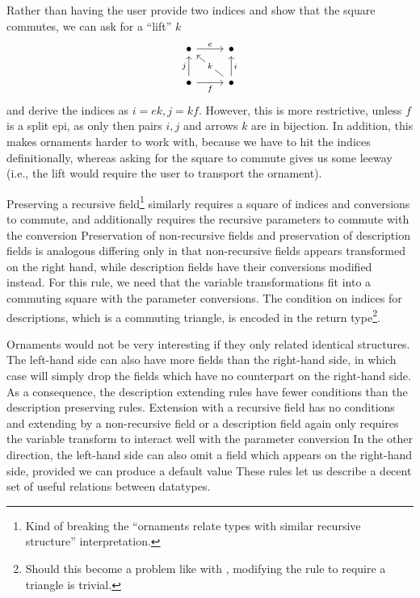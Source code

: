 \begin{remark}
    Rather than having the user provide two indices and show that the square commutes, we can ask for a ``lift'' $k$
    \[\begin{tikzcd}
        \bullet & \bullet \\
        \bullet & \bullet
        \arrow["e", from=1-1, to=1-2]
        \arrow["f"', from=2-1, to=2-2]
        \arrow["j", from=2-1, to=1-1]
        \arrow["i"', from=2-2, to=1-2]
        \arrow["k"{description}, from=2-2, to=1-1]
    \end{tikzcd}\]
    and derive the indices as $i = ek, j = kf$. However, this is more restrictive, unless $f$ is a split epi, as only then pairs $i,j$ and arrows $k$ are in bijection. In addition, this makes ornaments harder to work with, because we have to hit the indices definitionally, whereas asking for the square to commute gives us some leeway (i.e., the lift would require the user to transport the ornament). 
\end{remark}

Preserving a recursive field\footnote{Kind of breaking the ``ornaments relate types with similar recursive structure'' interpretation.} similarly requires a square of indices and conversions to commute, and additionally requires the recursive parameters to commute with the conversion
Preservation of non-recursive fields and preservation of description fields is analogous
differing only in that non-recursive fields appears transformed on the right hand, while description fields have their conversions modified instead. For this rule, we need that the variable transformations fit into a commuting square with the parameter conversions. The condition on indices for descriptions, which is a commuting triangle, is encoded in the return type\footnote{Should this become a problem like with , modifying the rule to require a triangle is trivial.}.

Ornaments would not be very interesting if they only related identical structures. The left-hand side can also have more fields than the right-hand side, in which case  will simply drop the fields which have no counterpart on the right-hand side. As a consequence, the description extending rules have fewer conditions than the description preserving rules. Extension with a recursive field has no conditions
and extending by a non-recursive field or a description field again only requires the variable transform to interact well with the parameter conversion
In the other direction, the left-hand side can also omit a field which appears on the right-hand side, provided we can produce a default value
These rules let us describe a decent set of useful relations between datatypes.

